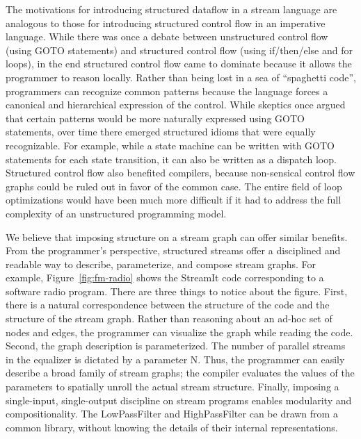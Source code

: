 
The motivations for introducing structured dataflow in a stream
language are analogous to those for introducing structured control
flow in an imperative language.  While there was once a debate between
unstructured control flow (using GOTO statements) and structured
control flow (using if/then/else and for loops), in the end structured
control flow came to dominate because it allows the programmer to
reason locally.  Rather than being lost in a sea of ``spaghetti
code'', programmers can recognize common patterns because the language
forces a canonical and hierarchical expression of the control.  While
skeptics once argued that certain patterns would be more naturally
expressed using GOTO statements, over time there emerged structured
idioms that were equally recognizable.  For example, while a state
machine can be written with GOTO statements for each state transition,
it can also be written as a dispatch loop.  Structured control flow
also benefited compilers, because non-sensical control flow graphs
could be ruled out in favor of the common case.  The entire field of
loop optimizations would have been much more difficult if it had to
address the full complexity of an unstructured programming model.

We believe that imposing structure on a stream graph can offer similar
benefits.  From the programmer's perspective, structured streams offer
a disciplined and readable way to describe, parameterize, and compose
stream graphs.  For example, Figure~\ref{fig:fm-radio} shows the
StreamIt code corresponding to a software radio program.  There are
three things to notice about the figure.  First, there is a natural
correspondence between the structure of the code and the structure of
the stream graph.  Rather than reasoning about an ad-hoc set of nodes
and edges, the programmer can visualize the graph while reading the
code.  Second, the graph description is parameterized.  The number of
parallel streams in the equalizer is dictated by a parameter N.  Thus,
the programmer can easily describe a broad family of stream graphs;
the compiler evaluates the values of the parameters to spatially
unroll the actual stream structure.  Finally, imposing a single-input,
single-output discipline on stream programs enables modularity and
compositionality.  The LowPassFilter and HighPassFilter can be drawn
from a common library, without knowing the details of their internal
representations.

